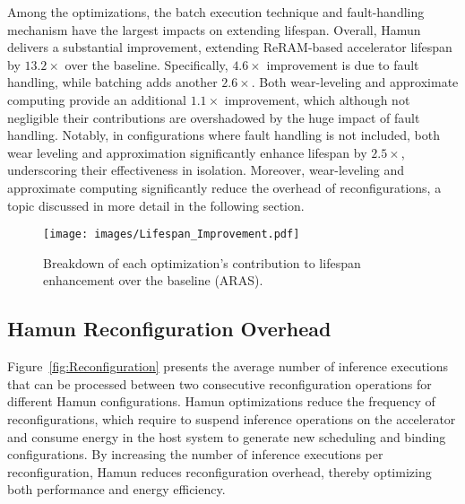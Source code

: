 
Among the optimizations, the batch execution technique and fault-handling mechanism have the largest impacts on extending lifespan. Overall, Hamun delivers a substantial improvement, extending ReRAM-based accelerator lifespan by $13.2\times$ over the baseline. Specifically, $4.6\times$ improvement is due to fault handling, while batching adds another $2.6\times$. Both wear-leveling and approximate computing provide an additional $1.1\times$ improvement, which although not negligible their contributions are overshadowed by the huge impact of fault handling. Notably, in configurations where fault handling is not included, both wear leveling and approximation significantly enhance lifespan by $2.5\times$, underscoring their effectiveness in isolation. Moreover, wear-leveling and approximate computing significantly reduce the overhead of reconfigurations, a topic discussed in more detail in the following section.

\begin{figure}[t!]
    \centering
    \texttt{[image: images/Lifespan\_Improvement.pdf]}
    \vskip -0.05in
    \caption{Breakdown of each optimization’s contribution to lifespan enhancement over the baseline (ARAS).}
    \label{fig:lifespan_Improvement}
    \vskip -0.20in
\end{figure}

\subsection{Hamun Reconfiguration Overhead}\label{subs:Scheduler_Utilizatio}
Figure~\ref{fig:Reconfiguration} presents the average number of inference executions that can be processed between two consecutive reconfiguration operations for different Hamun configurations. Hamun optimizations reduce the frequency of reconfigurations, which require to suspend inference operations on the accelerator and consume energy in the host system to generate new scheduling and binding configurations. By increasing the number of inference executions per reconfiguration, Hamun reduces reconfiguration overhead, thereby optimizing both performance and energy efficiency.

